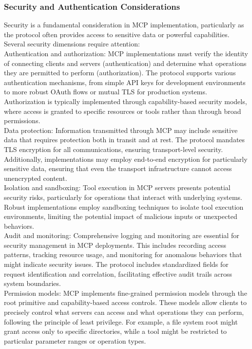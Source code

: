 \subsubsection{Security and Authentication Considerations}
Security is a fundamental consideration in MCP implementation, particularly as the protocol often provides access to sensitive data or powerful capabilities. Several security dimensions require attention:\\ \newline
Authentication and authorization: MCP implementations must verify the identity of connecting clients and servers (authentication) and determine what operations they are permitted to perform (authorization). The protocol supports various authentication mechanisms, from simple API keys for development environments to more robust OAuth flows or mutual TLS for production systems. Authorization is typically implemented through capability-based security models, where access is granted to specific resources or tools rather than through broad permissions.\\ \newline
Data protection: Information transmitted through MCP may include sensitive data that requires protection both in transit and at rest. The protocol mandates TLS encryption for all communications, ensuring transport-level security. Additionally, implementations may employ end-to-end encryption for particularly sensitive data, ensuring that even the transport infrastructure cannot access unencrypted content.\\ \newline
Isolation and sandboxing: Tool execution in MCP servers presents potential security risks, particularly for operations that interact with underlying systems. Robust implementations employ sandboxing techniques to isolate tool execution environments, limiting the potential impact of malicious inputs or unexpected behaviors.\\ \newline
Audit and monitoring: Comprehensive logging and monitoring are essential for security management in MCP deployments. This includes recording access patterns, tracking resource usage, and monitoring for anomalous behaviors that might indicate security issues. The protocol includes standardized fields for request identification and correlation, facilitating effective audit trails across system boundaries.\\ \newline
Permission models: MCP implements fine-grained permission models through the root primitive and capability-based access controls. These models allow clients to precisely control what servers can access and what operations they can perform, following the principle of least privilege. For example, a file system root might grant access only to specific directories, while a tool might be restricted to particular parameter ranges or operation types.\\ \newline
